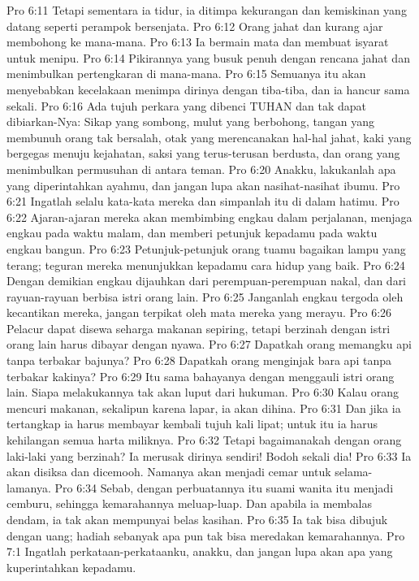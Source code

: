 Pro 6:11  Tetapi sementara ia tidur, ia ditimpa kekurangan dan kemiskinan yang datang seperti perampok bersenjata.
Pro 6:12  Orang jahat dan kurang ajar membohong ke mana-mana.
Pro 6:13  Ia bermain mata dan membuat isyarat untuk menipu.
Pro 6:14  Pikirannya yang busuk penuh dengan rencana jahat dan menimbulkan pertengkaran di mana-mana.
Pro 6:15  Semuanya itu akan menyebabkan kecelakaan menimpa dirinya dengan tiba-tiba, dan ia hancur sama sekali.
Pro 6:16  Ada tujuh perkara yang dibenci TUHAN dan tak dapat dibiarkan-Nya: Sikap yang sombong, mulut yang berbohong, tangan yang membunuh orang tak bersalah, otak yang merencanakan hal-hal jahat, kaki yang bergegas menuju kejahatan, saksi yang terus-terusan berdusta, dan orang yang menimbulkan permusuhan di antara teman.
Pro 6:20  Anakku, lakukanlah apa yang diperintahkan ayahmu, dan jangan lupa akan nasihat-nasihat ibumu.
Pro 6:21  Ingatlah selalu kata-kata mereka dan simpanlah itu di dalam hatimu.
Pro 6:22  Ajaran-ajaran mereka akan membimbing engkau dalam perjalanan, menjaga engkau pada waktu malam, dan memberi petunjuk kepadamu pada waktu engkau bangun.
Pro 6:23  Petunjuk-petunjuk orang tuamu bagaikan lampu yang terang; teguran mereka menunjukkan kepadamu cara hidup yang baik.
Pro 6:24  Dengan demikian engkau dijauhkan dari perempuan-perempuan nakal, dan dari rayuan-rayuan berbisa istri orang lain.
Pro 6:25  Janganlah engkau tergoda oleh kecantikan mereka, jangan terpikat oleh mata mereka yang merayu.
Pro 6:26  Pelacur dapat disewa seharga makanan sepiring, tetapi berzinah dengan istri orang lain harus dibayar dengan nyawa.
Pro 6:27  Dapatkah orang memangku api tanpa terbakar bajunya?
Pro 6:28  Dapatkah orang menginjak bara api tanpa terbakar kakinya?
Pro 6:29  Itu sama bahayanya dengan menggauli istri orang lain. Siapa melakukannya tak akan luput dari hukuman.
Pro 6:30  Kalau orang mencuri makanan, sekalipun karena lapar, ia akan dihina.
Pro 6:31  Dan jika ia tertangkap ia harus membayar kembali tujuh kali lipat; untuk itu ia harus kehilangan semua harta miliknya.
Pro 6:32  Tetapi bagaimanakah dengan orang laki-laki yang berzinah? Ia merusak dirinya sendiri! Bodoh sekali dia!
Pro 6:33  Ia akan disiksa dan dicemooh. Namanya akan menjadi cemar untuk selama-lamanya.
Pro 6:34  Sebab, dengan perbuatannya itu suami wanita itu menjadi cemburu, sehingga kemarahannya meluap-luap. Dan apabila ia membalas dendam, ia tak akan mempunyai belas kasihan.
Pro 6:35  Ia tak bisa dibujuk dengan uang; hadiah sebanyak apa pun tak bisa meredakan kemarahannya.
Pro 7:1  Ingatlah perkataan-perkataanku, anakku, dan jangan lupa akan apa yang kuperintahkan kepadamu.
